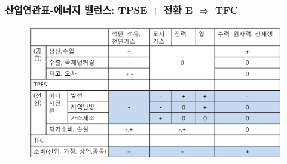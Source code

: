 \documentclass[10pt,compress,slidetop,%
			   hyperref={unicode},xcolor={svgnames},%
			   t]{beamer}
\begin{document}
\begin{frame}
	\frametitle{산업연관표-에너지 밸런스: TPSE + 전환 E $\Rightarrow$ TFC}
	  	\begin{figure}
	\centering
	 \includegraphics[width=1.00\textwidth]{EBKtarget.png}
	\label{IEA world balance}
	\end{figure}	
	
\end{frame}


% 
\end{document}
